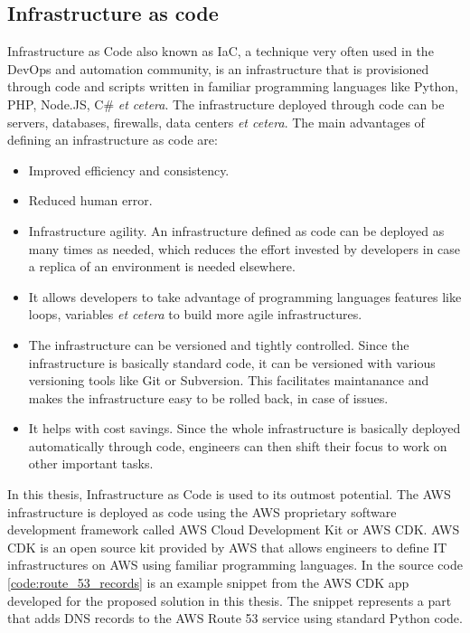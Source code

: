 \subsection{Infrastructure as code}
Infrastructure as Code also known as IaC, a technique very often used in the DevOps and automation community, is an infrastructure that is provisioned through code and scripts written in familiar programming languages like Python, PHP, Node.JS, C\# \textit{et cetera}. The infrastructure deployed through code can be servers, databases, firewalls, data centers \textit{et cetera}. The main advantages of defining an infrastructure as code are:

\begin{itemize}
    \item Improved efficiency and consistency.
    \item Reduced human error.
    \item Infrastructure agility. An infrastructure defined as code can be deployed as many times as needed, which reduces the effort invested by developers in case a replica of an environment is needed elsewhere.
    \item It allows developers to take advantage of programming languages features like loops, variables \textit{et cetera} to build more agile infrastructures.
    \item The infrastructure can be versioned and tightly controlled. Since the infrastructure is basically standard code, it can be versioned with various versioning tools like Git or Subversion. This facilitates maintanance and makes the infrastructure easy to be rolled back, in case of issues.
    \item It helps with cost savings. Since the whole infrastructure is basically deployed automatically through code, engineers can then shift their focus to work on other important tasks.
\end{itemize}

In this thesis, Infrastructure as Code is used to its outmost potential. The AWS infrastructure is deployed as code using the AWS proprietary software development framework called AWS Cloud Development Kit or AWS CDK. AWS CDK is an open source kit provided by AWS that allows engineers to define IT infrastructures on AWS using familiar programming languages. In the source code \ref{code:route_53_records} is an example snippet from the AWS CDK app developed for the proposed solution in this thesis. The snippet represents a part that adds DNS records to the AWS Route 53 service using standard Python code.

